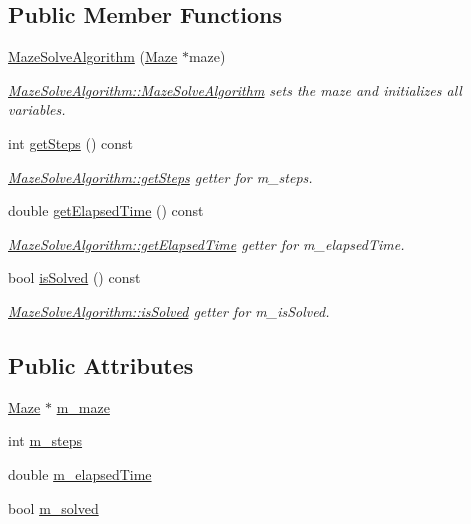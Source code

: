 \subsection*{Public Member Functions}
\begin{DoxyCompactItemize}
\item 
\hyperlink{class_maze_solve_algorithm_a403d0adac396c5aad4500e8700b0309d}{Maze\-Solve\-Algorithm} (\hyperlink{class_maze}{Maze} $\ast$maze)
\begin{DoxyCompactList}\small\item\em \hyperlink{class_maze_solve_algorithm_a403d0adac396c5aad4500e8700b0309d}{Maze\-Solve\-Algorithm\-::\-Maze\-Solve\-Algorithm} sets the maze and initializes all variables. \end{DoxyCompactList}\item 
int \hyperlink{class_maze_solve_algorithm_a69f1c6da39848354f26a5d6fb7dce3f6}{get\-Steps} () const 
\begin{DoxyCompactList}\small\item\em \hyperlink{class_maze_solve_algorithm_a69f1c6da39848354f26a5d6fb7dce3f6}{Maze\-Solve\-Algorithm\-::get\-Steps} getter for m\-\_\-steps. \end{DoxyCompactList}\item 
double \hyperlink{class_maze_solve_algorithm_a9522bc9a8fb6760e5bec78bfcc52ef53}{get\-Elapsed\-Time} () const 
\begin{DoxyCompactList}\small\item\em \hyperlink{class_maze_solve_algorithm_a9522bc9a8fb6760e5bec78bfcc52ef53}{Maze\-Solve\-Algorithm\-::get\-Elapsed\-Time} getter for m\-\_\-elapsed\-Time. \end{DoxyCompactList}\item 
bool \hyperlink{class_maze_solve_algorithm_ad1b31dffa81ae7ee84fd511aadc0fdb8}{is\-Solved} () const 
\begin{DoxyCompactList}\small\item\em \hyperlink{class_maze_solve_algorithm_ad1b31dffa81ae7ee84fd511aadc0fdb8}{Maze\-Solve\-Algorithm\-::is\-Solved} getter for m\-\_\-is\-Solved. \end{DoxyCompactList}\end{DoxyCompactItemize}
\subsection*{Public Attributes}
\begin{DoxyCompactItemize}
\item 
\hyperlink{class_maze}{Maze} $\ast$ \hyperlink{class_maze_solve_algorithm_a22988c0e0a5eaea83ce360be8e3a9ebb}{m\-\_\-maze}
\item 
int \hyperlink{class_maze_solve_algorithm_a16f9e281c4bcdc47575d7b75c244652e}{m\-\_\-steps}
\item 
double \hyperlink{class_maze_solve_algorithm_a1ca82a6e1f52cdb2f6bc3ea7b332e2f2}{m\-\_\-elapsed\-Time}
\item 
bool \hyperlink{class_maze_solve_algorithm_a1c7f66e1bc5c91f9d007ba0a79d239d0}{m\-\_\-solved}
\end{DoxyCompactItemize}
